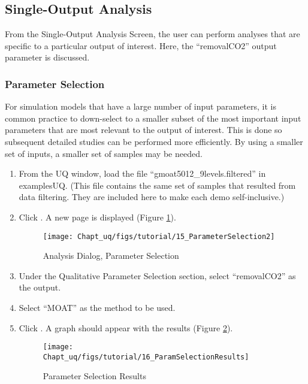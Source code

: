 \subsection{Single-Output Analysis}

From the Single-Output Analysis Screen, the user can perform analyses that are specific to a particular output of interest. Here, the ``removalCO2'' output parameter is discussed.

\subsubsection{Parameter Selection}
For simulation models that have a large number of input parameters, it is common practice to down-select to a smaller subset of the most important input parameters that are most relevant to the output of interest. This is done so subsequent detailed studies can be performed more efficiently.  By using a smaller set of inputs, a smaller set of samples may be needed.
\begin{enumerate}
\item{From the UQ window, load the file ``gmoat5012\_9levels.filtered'' in examples\bs UQ. (This file contains the same set of samples that resulted from data filtering. They are included here to make each demo self-inclusive.)}
\item{Click . A new page is displayed (Figure \ref{fig:uqt_analysis_param}).
\begin{figure}[H]
\centering \texttt{[image: Chapt\_uq/figs/tutorial/15\_ParameterSelection2]}
\caption{Analysis Dialog, Parameter Selection}
\label{fig:uqt_analysis_param}
\end{figure}
}
\item{Under the Qualitative Parameter Selection section, select ``removalCO2'' as the output.}
\item{Select ``MOAT'' as the method to be used.}
\item{Click . A graph should appear with the results (Figure \ref{fig:uqt_param_results}).
\begin{figure}[H]
\centering \texttt{[image: Chapt\_uq/figs/tutorial/16\_ParamSelectionResults]}
\caption{Parameter Selection Results}
\label{fig:uqt_param_results}
\end{figure}
}
\end{enumerate}

